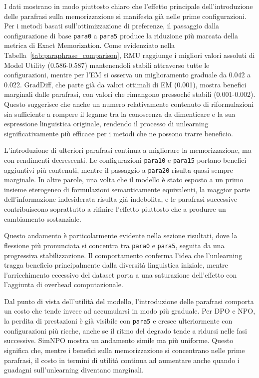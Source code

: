I dati mostrano in modo piuttosto chiaro che l'effetto principale dell'introduzione delle parafrasi sulla memorizzazione si manifesta già nelle prime configurazioni. Per i metodi basati sull'ottimizzazione di preferenze, il passaggio dalla configurazione di base \texttt{para0} a \texttt{para5} produce la riduzione più marcata della metrica di Exact Memorization. Come evidenziato nella Tabella~\ref{tab:paraphrase_comparison}, RMU raggiunge i migliori valori assoluti di Model Utility (0.586-0.587) mantenendoli stabili attraverso tutte le configurazioni, mentre per l'EM si osserva un miglioramento graduale da 0.042 a 0.022. GradDiff, che parte già da valori ottimali di EM (0.001), mostra benefici marginali dalle parafrasi, con valori che rimangono pressoché stabili (0.001-0.002). Questo suggerisce che anche un numero relativamente contenuto di riformulazioni sia sufficiente a rompere il legame tra la conoscenza da dimenticare e la sua espressione linguistica originale, rendendo il processo di unlearning significativamente più efficace per i metodi che ne possono trarre beneficio.

L’introduzione di ulteriori parafrasi continua a migliorare la memorizzazione, ma con rendimenti decrescenti. Le configurazioni \texttt{para10} e \texttt{para15} portano benefici aggiuntivi più contenuti, mentre il passaggio a \texttt{para20} risulta quasi sempre marginale. In altre parole, una volta che il modello è stato esposto a un primo insieme eterogeneo di formulazioni semanticamente equivalenti, la maggior parte dell’informazione indesiderata risulta già indebolita, e le parafrasi successive contribuiscono soprattutto a rifinire l’effetto piuttosto che a produrre un cambiamento sostanziale.

Questo andamento è particolarmente evidente nella sezione risultati, dove la flessione più pronunciata si concentra tra \texttt{para0} e \texttt{para5}, seguita da una progressiva stabilizzazione. Il comportamento conferma l'idea che l'unlearning tragga beneficio principalmente dalla diversità linguistica iniziale, mentre l'arricchimento eccessivo del dataset porta a una saturazione dell'effetto con l'aggiunta di overhead computazionale.

Dal punto di vista dell’utilità del modello, l’introduzione delle parafrasi comporta un costo che tende invece ad accumularsi in modo più graduale. Per DPO e NPO, la perdita di prestazioni è già visibile con \texttt{para5} e cresce ulteriormente con configurazioni più ricche, anche se il ritmo del degrado tende a ridursi nelle fasi successive. SimNPO mostra un andamento simile ma più uniforme. Questo significa che, mentre i benefici sulla memorizzazione si concentrano nelle prime parafrasi, il costo in termini di utilità continua ad aumentare anche quando i guadagni sull’unlearning diventano marginali.

